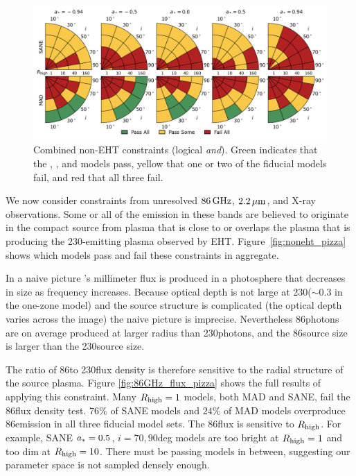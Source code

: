 \begin{figure}
  \centering
  \includegraphics[width=\textwidth]{./figures/Non_Interferometric_Constraints.png}
  \caption{Combined non-EHT constraints (logical {\em and}).
    Green indicates that the \kharma, \bhac, and \hamr models pass, yellow that one or two of the fiducial models fail, and red that all three fail.}
  \label{fig:non_eht_cuts}
\end{figure}

We now consider constraints from unresolved $86\,\mathrm{GHz}$, $2.2\,\mu\mathrm{m}$, and X-ray
observations.
Some or all of the emission in these bands are believed to originate
in the compact source from plasma that is close to or overlaps the
plasma that is producing the 230\GHz-emitting plasma observed by EHT.
Figure~\ref{fig:noneht_pizza} shows which models pass and fail these
constraints in aggregate.


In a naive picture \sgra's millimeter flux is produced in a photosphere that decreases in size as frequency increases.
Because optical depth is not large at 230\GHz ($\sim 0.3$ in the one-zone model) and the source structure is complicated (the optical depth varies across the image) the naive picture is imprecise.
Nevertheless 86\GHz photons are on average produced at larger radius than 230\GHz photons, and the 86\GHz source size is larger than the 230\GHz source size.

The ratio of 86\GHz to 230\GHz flux density is therefore sensitive to the radial structure of the source plasma.
Figure \ref{fig:86GHz_flux_pizza} shows the full results of applying this constraint.
Many $R_\mathrm{high} = 1$ models, both MAD and SANE, fail the 86\GHz flux density test.
$76\%$ of SANE models and $24\%$ of MAD models overproduce 86\GHz emission in all three fiducial model sets.
The 86\GHz flux is sensitive to $R_\mathrm{high}$.
For example, SANE $a_* = 0.5$, $i = 70,90$deg models are too bright at $R_\mathrm{high} = 1$ and too dim at $R_\mathrm{high} = 10$.
There must be passing models in between, suggesting our parameter space is not sampled densely enough.


